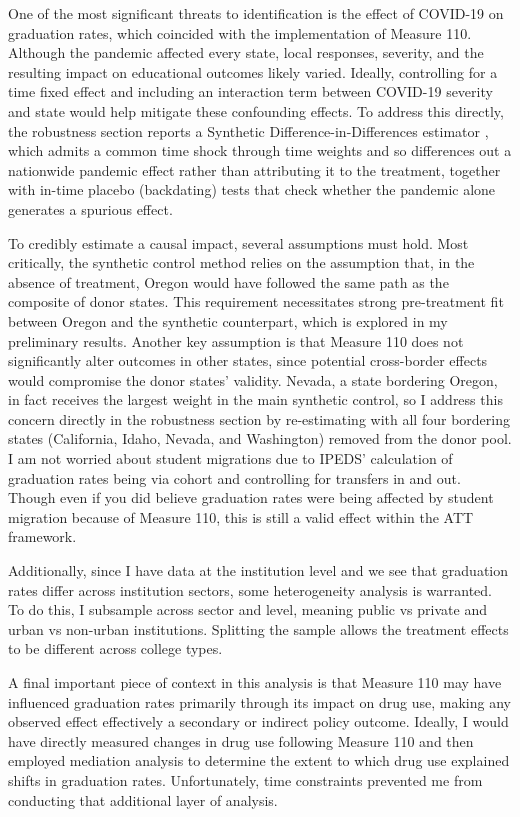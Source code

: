 \documentclass[12pt]{article}
\begin{document}
One of the most significant threats to identification is the effect of
COVID-19 on graduation rates, which coincided with the implementation of
Measure 110. Although the pandemic affected every state, local responses,
severity, and the resulting impact on educational outcomes likely varied.
Ideally, controlling for a time fixed effect and including an interaction
term between COVID-19 severity and state would help mitigate these
confounding effects. To address this directly, the robustness section
reports a Synthetic Difference-in-Differences estimator
\cite{arkhangelsky2021synthetic}, which admits a common time shock through
time weights and so differences out a nationwide pandemic effect rather than
attributing it to the treatment, together with in-time placebo (backdating)
tests that check whether the pandemic alone generates a spurious effect.

To credibly estimate a causal impact, several assumptions must hold. Most
critically, the synthetic control method relies on the assumption that, in
the absence of treatment, Oregon would have followed the same path as the
composite of donor states. This requirement necessitates strong
pre-treatment fit between Oregon and the synthetic counterpart, which is
explored in my preliminary results. Another key assumption is that Measure
110 does not significantly alter outcomes in other states, since potential
cross-border effects would compromise the donor states' validity. Nevada, a
state bordering Oregon, in fact receives the largest weight in the main
synthetic control, so I address this concern directly in the robustness
section by re-estimating with all four bordering states (California, Idaho,
Nevada, and Washington) removed from the donor pool. I am not worried about
student
migrations due to IPEDS' calculation of graduation rates being via cohort
and controlling for transfers in and out. Though even if you did believe
graduation rates were being affected by student migration because of
Measure 110, this is still a valid effect within the ATT framework.

Additionally, since I have data at the institution level and we see that
graduation rates differ across institution sectors, some heterogeneity
analysis is warranted. To do this, I subsample across sector and level,
meaning public vs private and urban vs non-urban institutions. Splitting
the sample allows the treatment effects to be different across college
types.

A final important piece of context in this analysis is that Measure 110 may
have influenced graduation rates primarily through its impact on drug use,
making any observed effect effectively a secondary or indirect policy
outcome. Ideally, I would have directly measured changes in drug use
following Measure 110 and then employed mediation analysis to determine the
extent to which drug use explained shifts in graduation rates.
Unfortunately, time constraints prevented me from conducting that
additional layer of analysis.
\end{document}
